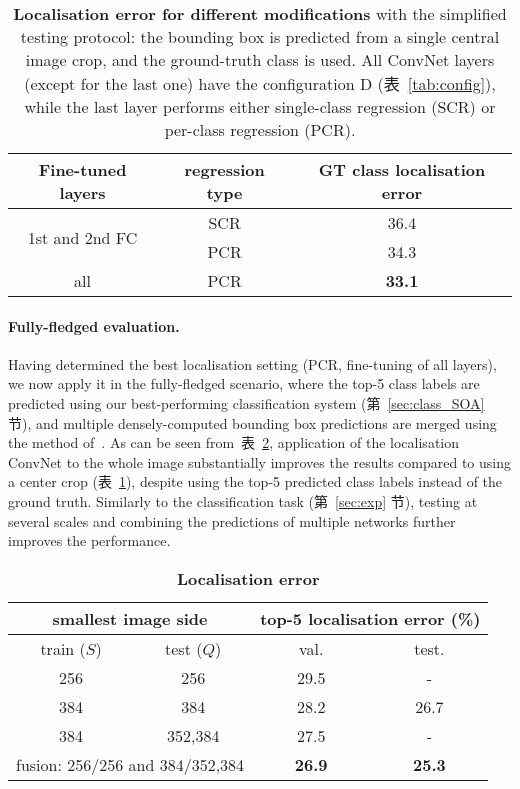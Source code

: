 \documentclass{article} %
\newcommand{\tblref}[1]{表~\ref{#1}}
\newcommand{\sref}[1]{第~\ref{#1} 节}
\begin{document}
\begin{table}[htb]
\setlength{\tabcolsep}{2pt}
\small
\centering
\caption{\textbf{Localisation error for different modifications} with
the simplified testing protocol: the bounding box is predicted from a single central image crop, and the ground-truth class is used.
All ConvNet layers (except for the last one) have the configuration D (\tblref{tab:config}), while
the last layer performs either single-class regression (SCR) or per-class regression (PCR). 
}
\begin{tabular}{|c|c|c|} \hline
Fine-tuned layers & regression type & GT class localisation error \\ \hline
\multirow{2}{*}{1st and 2nd FC} & SCR & 36.4 \\ \cline{2-3}
& PCR & 34.3 \\ \hline
all & PCR & \textbf{33.1} \\ \hline
\end{tabular}
\label{tab:loc_comparison}
\end{table}

\paragraph{Fully-fledged evaluation.}
Having determined the best localisation setting (PCR, fine-tuning of all layers), we now apply it in the fully-fledged scenario,
where the top-5 class labels are predicted using our best-performing classification system (\sref{sec:class_SOA}), and multiple densely-computed bounding box predictions are merged using 
the method of~\citet{Sermanet14}.
As can be seen from~\tblref{tab:loc_full}, application of the localisation ConvNet to the whole image substantially improves the results compared to using a center crop (\tblref{tab:loc_comparison}),
despite using the top-5 predicted class labels instead of the ground truth.
Similarly to the classification task (\sref{sec:exp}), testing at several scales and combining the predictions of multiple networks
further improves the performance.

\begin{table}[htb]
\small
\centering
\caption{\textbf{Localisation error}
}
\begin{tabular}{|c|c|c|c|} \hline
\multicolumn{2}{|c|}{smallest image side} & \multicolumn{2}{c|}{top-5 localisation error (\%)} \\ \hline
train ($S$) & test ($Q$) & val. & test. \\ \hline
256 & 256 & 29.5 & - \\ \hline
384 & 384 & 28.2 & 26.7\\ \hline
384 & 352,384 & 27.5 & - \\ \hline\hline
\multicolumn{2}{|c|}{fusion: 256/256 and 384/352,384} & \textbf{26.9} & \textbf{25.3} \\ \hline
\end{tabular}
\label{tab:loc_full}
\end{table}
\end{document}
